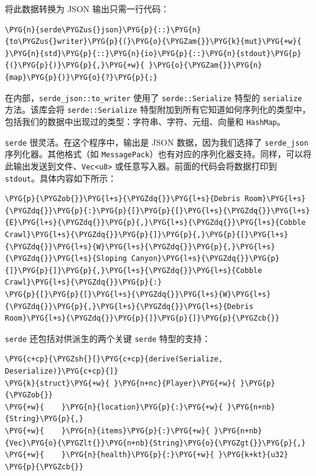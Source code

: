 将此数据转换为 JSON 输出只需一行代码：

\begin{Verbatim}[commandchars=\\\{\},breaklines=true,breakanywhere=true,fontsize=\codefont,xleftmargin=17bp]
\PYG{n}{serde\PYGZus{}json}\PYG{p}{::}\PYG{n}{to\PYGZus{}writer}\PYG{p}{(}\PYG{o}{\PYGZam{}}\PYG{k}{mut}\PYG{+w}{ }\PYG{n}{std}\PYG{p}{::}\PYG{n}{io}\PYG{p}{::}\PYG{n}{stdout}\PYG{p}{(}\PYG{p}{)}\PYG{p}{,}\PYG{+w}{ }\PYG{o}{\PYGZam{}}\PYG{n}{map}\PYG{p}{)}\PYG{o}{?}\PYG{p}{;}
\end{Verbatim}

在内部，\texttt{serde\_json::to\_writer} 使用了 \texttt{serde::Serialize} 特型的 \texttt{serialize} 方法。该库会将 \texttt{serde::Serialize} 特型附加到所有它知道如何序列化的类型中，包括我们的数据中出现过的类型：字符串、字符、元组、向量和 \texttt{HashMap}。

\texttt{serde} 很灵活。在这个程序中，输出是 JSON 数据，因为我们选择了 \texttt{serde\_json} 序列化器。其他格式（如 \texttt{MessagePack}）也有对应的序列化器支持。同样，可以将此输出发送到文件、\texttt{Vec<u8>} 或任意写入器。前面的代码会将数据打印到 \texttt{stdout}。具体内容如下所示：

\begin{Verbatim}[commandchars=\\\{\},breaklines=true,breakanywhere=true,fontsize=\codefont,xleftmargin=17bp]
\PYG{p}{\PYGZob{}}\PYG{l+s}{\PYGZdq{}}\PYG{l+s}{Debris Room}\PYG{l+s}{\PYGZdq{}}\PYG{p}{:}\PYG{p}{[}\PYG{p}{[}\PYG{l+s}{\PYGZdq{}}\PYG{l+s}{E}\PYG{l+s}{\PYGZdq{}}\PYG{p}{,}\PYG{l+s}{\PYGZdq{}}\PYG{l+s}{Cobble Crawl}\PYG{l+s}{\PYGZdq{}}\PYG{p}{]}\PYG{p}{,}\PYG{p}{[}\PYG{l+s}{\PYGZdq{}}\PYG{l+s}{W}\PYG{l+s}{\PYGZdq{}}\PYG{p}{,}\PYG{l+s}{\PYGZdq{}}\PYG{l+s}{Sloping Canyon}\PYG{l+s}{\PYGZdq{}}\PYG{p}{]}\PYG{p}{]}\PYG{p}{,}\PYG{l+s}{\PYGZdq{}}\PYG{l+s}{Cobble Crawl}\PYG{l+s}{\PYGZdq{}}\PYG{p}{:}
\PYG{p}{[}\PYG{p}{[}\PYG{l+s}{\PYGZdq{}}\PYG{l+s}{W}\PYG{l+s}{\PYGZdq{}}\PYG{p}{,}\PYG{l+s}{\PYGZdq{}}\PYG{l+s}{Debris Room}\PYG{l+s}{\PYGZdq{}}\PYG{p}{]}\PYG{p}{]}\PYG{p}{\PYGZcb{}}
\end{Verbatim}

\texttt{serde} 还包括对供派生的两个关键 \texttt{serde} 特型的支持：

\begin{Verbatim}[commandchars=\\\{\},breaklines=true,breakanywhere=true,fontsize=\codefont,xleftmargin=17bp]
\PYG{c+cp}{\PYGZsh{}[}\PYG{c+cp}{derive(Serialize, Deserialize)}\PYG{c+cp}{]}
\PYG{k}{struct}\PYG{+w}{ }\PYG{n+nc}{Player}\PYG{+w}{ }\PYG{p}{\PYGZob{}}
\PYG{+w}{    }\PYG{n}{location}\PYG{p}{:}\PYG{+w}{ }\PYG{n+nb}{String}\PYG{p}{,}
\PYG{+w}{    }\PYG{n}{items}\PYG{p}{:}\PYG{+w}{ }\PYG{n+nb}{Vec}\PYG{o}{\PYGZlt{}}\PYG{n+nb}{String}\PYG{o}{\PYGZgt{}}\PYG{p}{,}
\PYG{+w}{    }\PYG{n}{health}\PYG{p}{:}\PYG{+w}{ }\PYG{k+kt}{u32}
\PYG{p}{\PYGZcb{}}
\end{Verbatim}


